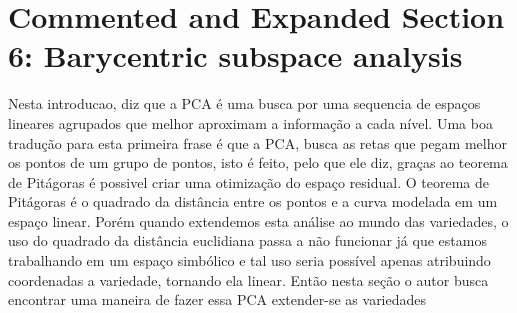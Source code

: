 \documentclass[a4paper,titlepage]{article}
\begin{document}
\section{Commented and Expanded Section 6: Barycentric subspace analysis}


{
\vspace{1em}
\vspace{1em}
}
Nesta introducao, diz que a PCA é uma busca por uma sequencia de espaços lineares agrupados que melhor aproximam a informação a cada nível. Uma boa tradução para esta primeira frase é que a PCA, busca as retas que pegam melhor os pontos de um grupo de pontos, isto é feito, pelo que ele diz, graças ao teorema de Pitágoras é possivel criar uma otimização do espaço residual. O teorema de Pitágoras é o quadrado da distância entre os pontos e a curva modelada em um espaço linear. Porém quando extendemos esta análise ao mundo das variedades, o uso do quadrado da distância euclidiana passa a não funcionar já que estamos trabalhando em um espaço simbólico e tal uso seria possível apenas atribuindo coordenadas a variedade, tornando ela linear. Então nesta seção o autor busca encontrar uma maneira de fazer essa PCA extender-se as variedades

{
\vspace{1em}
\vspace{1em}
}
\end{document}
